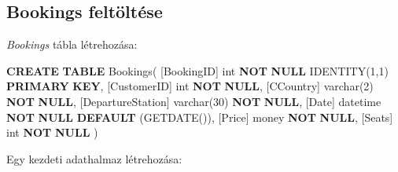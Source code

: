 \documentclass[
]{article}
\newenvironment{Shaded}{\begin{snugshade}}{\end{snugshade}}
\newcommand{\DataTypeTok}[1]{\textcolor[rgb]{0.56,0.13,0.00}{#1}}
\newcommand{\DecValTok}[1]{\textcolor[rgb]{0.25,0.63,0.44}{#1}}
\newcommand{\KeywordTok}[1]{\textcolor[rgb]{0.00,0.44,0.13}{\textbf{#1}}}
\newcommand{\NormalTok}[1]{#1}
\begin{document}
\hypertarget{bookings-feltuxf6ltuxe9se}{%
\subsection{Bookings feltöltése}\label{bookings-feltuxf6ltuxe9se}}

\emph{Bookings} tábla létrehozása:

\begin{Shaded}
\begin{Highlighting}[]
\KeywordTok{CREATE} \KeywordTok{TABLE}\NormalTok{ Bookings(}
\NormalTok{[BookingID] }\DataTypeTok{int} \KeywordTok{NOT} \KeywordTok{NULL}\NormalTok{ IDENTITY(}\DecValTok{1}\NormalTok{,}\DecValTok{1}\NormalTok{) }\KeywordTok{PRIMARY} \KeywordTok{KEY}\NormalTok{,}
\NormalTok{[CustomerID] }\DataTypeTok{int} \KeywordTok{NOT} \KeywordTok{NULL}\NormalTok{,}
\NormalTok{[CCountry] }\DataTypeTok{varchar}\NormalTok{(}\DecValTok{2}\NormalTok{) }\KeywordTok{NOT} \KeywordTok{NULL}\NormalTok{,}
\NormalTok{[DepartureStation] }\DataTypeTok{varchar}\NormalTok{(}\DecValTok{30}\NormalTok{) }\KeywordTok{NOT} \KeywordTok{NULL}\NormalTok{,}
\NormalTok{[}\DataTypeTok{Date}\NormalTok{] datetime }\KeywordTok{NOT} \KeywordTok{NULL} \KeywordTok{DEFAULT}\NormalTok{ (GETDATE()),}
\NormalTok{[Price] money }\KeywordTok{NOT} \KeywordTok{NULL}\NormalTok{,}
\NormalTok{[Seats] }\DataTypeTok{int} \KeywordTok{NOT} \KeywordTok{NULL}
\NormalTok{)}
\end{Highlighting}
\end{Shaded}

Egy kezdeti adathalmaz létrehozása:
\end{document}
